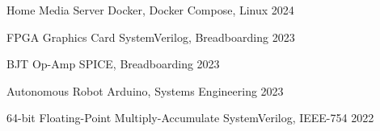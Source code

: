 

\begin{cvhonors}

  \cvhonor
    {Home Media Server} %
    {Docker, Docker Compose, Linux} %
    {} %
    {2024} %

  \cvhonor
    {FPGA Graphics Card} %
    {SystemVerilog, Breadboarding} %
    {} %
    {2023} %

  \cvhonor
    {BJT Op-Amp} %
    {SPICE, Breadboarding} %
    {} %
    {2023} %

  \cvhonor
    {Autonomous Robot} %
    {Arduino, Systems Engineering} %
    {} %
    {2023} %

  \cvhonor
    {64-bit Floating-Point Multiply-Accumulate} %
    {SystemVerilog, IEEE-754} %
    {} %
    {2022} %

\end{cvhonors}
